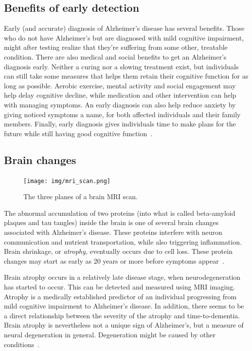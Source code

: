 \documentclass{kththesis}
\begin{document}
\subsection{Benefits of early detection}
Early (and accurate) diagnosis of Alzheimer's disease has several benefits. Those who do not have Alzheimer's but are diagnosed with mild cognitive impairment, might after testing realize that they're suffering from some other, treatable condition. There are also medical and social benefits to get an Alzheimer's diagnosis early. Neither a curing nor a slowing treatment exist, but individuals can still take some measures that helps them retain their cognitive function for as long as possible. Aerobic exercise, mental activity and social engagement may help delay cognitive decline, while medication and other intervention can help with managing symptoms. An early diagnosis can also help reduce anxiety by giving noticed symptoms a name, for both affected individuals and their family members. Finally, early diagnosis gives individuals time to make plans for the future while still having good cognitive function~\cite[p. 406-409]{factsfigures2018}.

\subsection{Brain changes}
\begin{figure}
  \centering
  \texttt{[image: img/mri\_scan.png]}
  \caption{The three planes of a brain MRI scan.}
\end{figure}
The abnormal accumulation of two proteins (into what is called beta-amyloid plaques and tau tangles) inside the brain is one of several brain changes associated with Alzheimer's disease. These proteins interfere with neuron communication and nutrient transportation, while also triggering inflammation. Brain shrinkage, or \textit{atrophy,} eventually occurs due to cell loss. These protein changes may start as early as 20 years or more before symptoms appear~\cite{factsfigures2018}.

Brain atrophy occurs in a relatively late disease stage, when neurodegeneration has started to occur. This can be detected and measured using MRI imaging. Atrophy is a medically established predictor of an individual progressing from mild cognitive impairment to Alzheimer's disease. In addition, there seems to be a direct relationship between the severity of the atrophy and time-to-dementia. Brain atrophy is nevertheless not a unique sign of Alzheimer's, but a measure of neural degeneration in general. Degeneration might be caused by other conditions~\cite{jack2010brain}.
\end{document}
